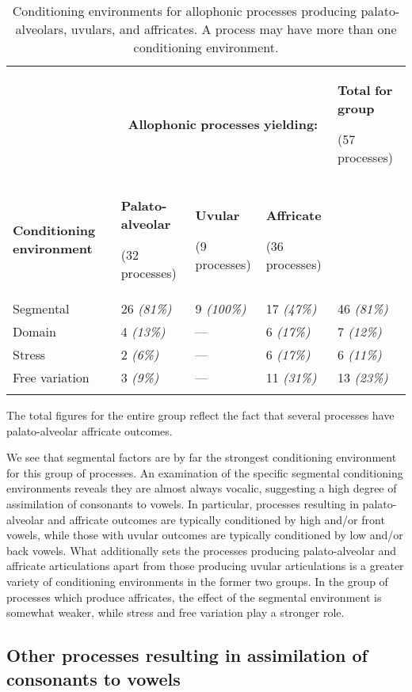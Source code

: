 \begin{table}
\begin{tabularx}{\textwidth}{XXXXX}
\lsptoprule
 & \multicolumn{3}{c}{ \textbf{Allophonic} \textbf{processes} \textbf{yielding:}} & { \textbf{Total} \textbf{for} \textbf{group}}

 (57 processes)\\
 \textbf{Conditioning} \textbf{environment} & { \textbf{Palato-alveolar}}

 (32 processes) & { \textbf{Uvular}}

 (9 processes) & { \textbf{Affricate}}

 (36 processes) & \\
 Segmental & 26 \textit{(81\%)} & 9 \textit{(100\%)} & 17 \textit{(47\%)} & 46 \textit{(81\%)}\\
 Domain & 4 \textit{(13\%)} & — & 6 \textit{(17\%)} & 7 \textit{(12\%)}\\
 Stress & 2 \textit{(6\%)} & — & 6 \textit{(17\%)} & 6 \textit{(11\%)}\\
 Free variation & 3 \textit{(9\%)} & — & 11 \textit{(31\%)} & 13 \textit{(23\%)}\\
\lspbottomrule
\end{tabularx}
\caption{\label{7.2}Conditioning environments for allophonic processes producing palato-alveolars, uvulars, and affricates. A process may have more than one conditioning environment.}The total figures for the entire group reflect the fact that several processes have palato-alveolar affricate outcomes.
\end{table}

  We see that segmental factors are by far the strongest conditioning environment for this group of processes. An examination of the specific segmental conditioning environments reveals they are almost always vocalic, suggesting a high degree of assimilation of consonants to vowels.  In particular, processes resulting in palato-alveolar and affricate outcomes are typically conditioned by high and/or front vowels, while those with uvular outcomes are typically conditioned by low and/or back vowels. What additionally sets the processes producing palato-alveolar and affricate articulations apart from those producing uvular articulations is a greater variety of conditioning environments in the former two groups. In the group of processes which produce affricates, the effect of the segmental environment is somewhat weaker, while stress and free variation play a stronger role.

\subsection{Other processes resulting in assimilation of consonants to vowels}\label{sec:7.3.3}

